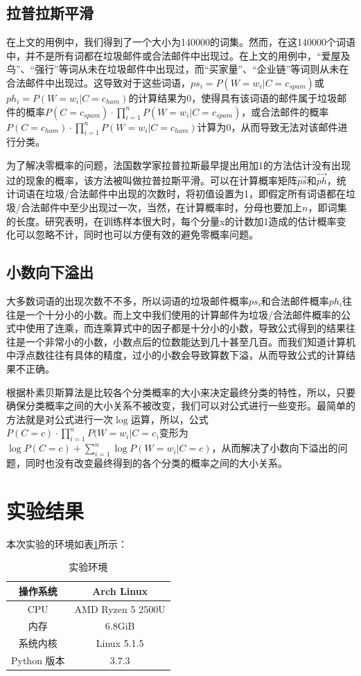 \documentclass[UTF8,zihao=-4]{ctexart}
\begin{document}
\subsection{拉普拉斯平滑}
	在上文的用例中，我们得到了一个大小为140000的词集。然而，在这140000个词语中，并不是所有词都在垃圾邮件或合法邮件中出现过。在上文的用例中，“爱屋及乌”、“强行”等词从未在垃圾邮件中出现过，而“买家量”、“企业链”等词则从未在合法邮件中出现过。这导致对于这些词语，$ps_i=P(W=w_i|C=c_{spam})$或$ph_i=P(W=w_i|C=c_{ham})$的计算结果为0，使得具有该词语的邮件属于垃圾邮件的概率$P(C=c_{spam}) \cdot \prod\limits_{i=1}^{n} P(W=w_i|C=c_{spam})$，或合法邮件的概率$P(C=c_{ham}) \cdot \prod\limits_{i=1}^{n} P(W=w_i|C=c_{ham})$计算为0，从而导致无法对该邮件进行分类。
	
	为了解决零概率的问题，法国数学家拉普拉斯最早提出用加1的方法估计没有出现过的现象的概率，该方法被叫做拉普拉斯平滑。可以在计算概率矩阵$\vec{ps}$和$\vec{ph}$，统计词语在垃圾/合法邮件中出现的次数时，将初值设置为1，即假定所有词语都在垃圾/合法邮件中至少出现过一次，当然，在计算概率时，分母也要加上$n$，即词集的长度。研究表明，在训练样本很大时，每个分量x的计数加1造成的估计概率变化可以忽略不计，同时也可以方便有效的避免零概率问题。
\subsection{小数向下溢出}
	大多数词语的出现次数不不多，所以词语的垃圾邮件概率$ps_i$和合法邮件概率$ph_i$往往是一个十分小的小数。而上文中我们使用的计算邮件为垃圾/合法邮件概率的公式中使用了连乘，而连乘算式中的因子都是十分小的小数，导致公式得到的结果往往是一个非常小的小数，小数点后的位数能达到几十甚至几百。而我们知道计算机中浮点数往往有具体的精度，过小的小数会导致算数下溢，从而导致公式的计算结果不正确。
	
	根据朴素贝斯算法是比较各个分类概率的大小来决定最终分类的特性，所以，只要确保分类概率之间的大小关系不被改变，我们可以对公式进行一些变形。最简单的方法就是对公式进行一次$\log$运算，所以，公式$P(C=c) \cdot \prod\limits_{i=1}^{n} P(W=w_i|C=c_)$变形为$\log P(C=c) + \sum\limits_{i=1}^{n}\log P(W=w_i|C=c)$，从而解决了小数向下溢出的问题，同时也没有改变最终得到的各个分类的概率之间的大小关系。

\section{实验结果}
	本次实验的环境如表\ref{tab:env}所示：
	\begin{table}[!htpb]
		\centering
		\caption{实验环境}
		\label{tab:env}
		\begin{tabular}{|c|c|}
			\hline
			操作系统&Arch Linux\\
			\hline
			CPU&AMD Ryzen 5 2500U\\
			\hline
			内存&6.8GiB\\
			\hline
			系统内核&Linux 5.1.5\\
			\hline
			Python 版本&3.7.3\\
			\hline
		\end{tabular}
	\end{table}
\end{document}
